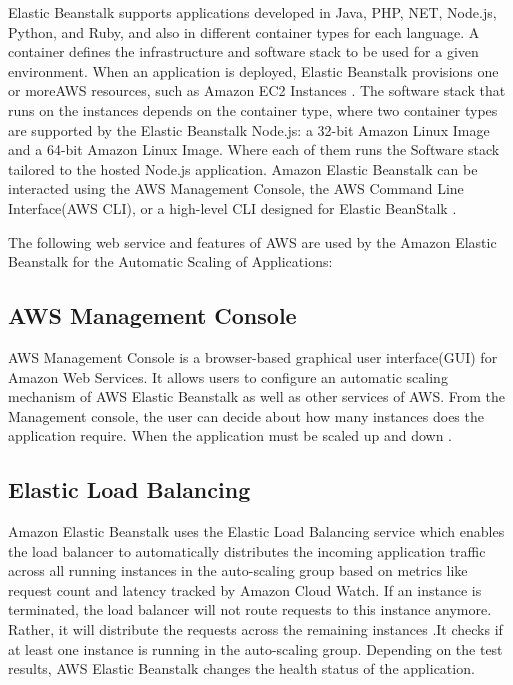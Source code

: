 \documentclass[9pt,twocolumn,twoside]{../../styles/osajnl}
\begin{document}
Elastic Beanstalk supports applications developed in Java, PHP, NET,
Node.js, Python, and Ruby, and also in different container types for
each language. A container defines the infrastructure and software
stack to be used for a given environment. When an application is
deployed, Elastic Beanstalk provisions one or moreAWS resources, such
as Amazon EC2 Instances \cite{elastic-beanstalk-book}. The software
stack that runs on the instances depends on the container type, where
two container types are supported by the Elastic Beanstalk Node.js: a
32-bit Amazon Linux Image and a 64-bit Amazon Linux Image. Where each
of them runs the Software stack tailored to the hosted Node.js
application. Amazon Elastic Beanstalk can be interacted using the AWS
Management Console, the AWS Command Line Interface(AWS CLI), or a
high-level CLI designed for Elastic BeanStalk
\cite{elastic-beanstalk-book}.

The following web service and features of AWS are used by the Amazon
Elastic Beanstalk for the Automatic Scaling of Applications:

\subsection{AWS Management Console}

AWS Management Console is a browser-based graphical user
interface(GUI) for Amazon Web Services. It allows users to configure
an automatic scaling mechanism of AWS Elastic Beanstalk as well as
other services of AWS. From the Management console, the user can decide
about how many instances does the application require. When the
application must be scaled up and down \cite{elastic-beanstalk}.

\subsection{Elastic Load Balancing}

Amazon Elastic Beanstalk uses the Elastic Load Balancing service which
enables the load balancer to automatically distributes the incoming
application traffic across all running instances in the auto-scaling
group based on metrics like request count and latency tracked by
Amazon Cloud Watch. If an instance is terminated, the load balancer
will not route requests to this instance anymore. Rather, it will
distribute the requests across the remaining instances
\cite{elastic-loadbalancing} .It checks if at least one instance is
running in the auto-scaling group. Depending on the test results, AWS
Elastic Beanstalk changes the health status of the application.
\end{document}
